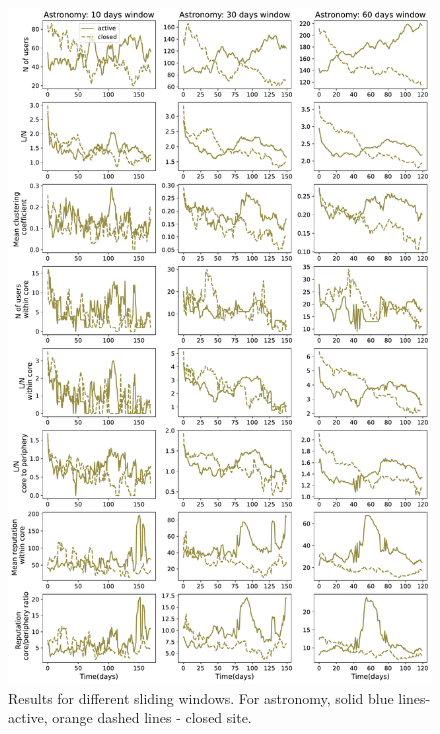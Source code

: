 \begin{figure}[!ht]
	\centering
	\includegraphics[width=0.9\linewidth]{figures/stackexchange/sliding_window.pdf}
	\caption[Stack Exchange properties for different sliding window.]{Results for different sliding windows. For astronomy, solid blue lines- active, orange dashed lines - closed site. }
	\label{fig:windows}
\end{figure}
